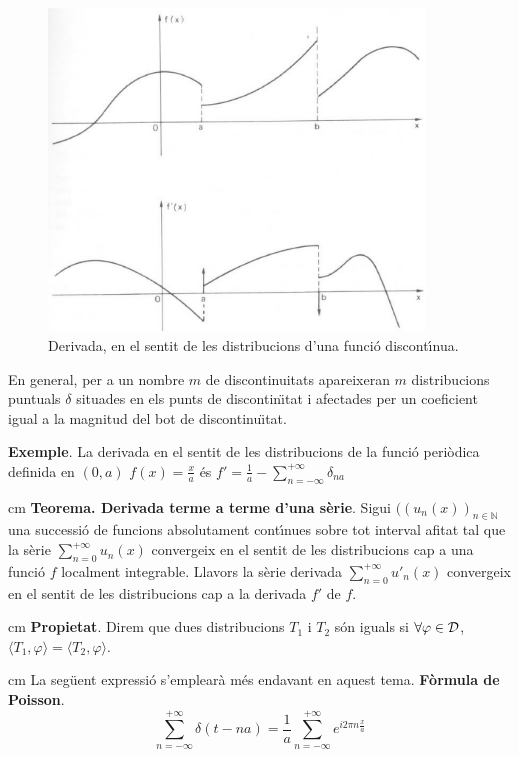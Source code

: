\documentclass{article}
\def\N{\mathbb N}
\begin{document}
\begin{figure}[htbp]
\begin{center}
\includegraphics[width=10cm]{imatges/derdiscontinua.eps}
\caption{Derivada, en el sentit de les distribucions d'una funci\'o
discont\'\i nua.}
\label{derBot.fig}
\end{center}
\end{figure}

\noindent
En general, per a un nombre $m$ de discontinuitats apareixeran $m$ 
distribucions puntuals $\delta$ situades en els punts de discontin\"\i tat
i afectades per un coeficient igual a la magnitud del bot de 
discontinu\"\i tat.

\noindent
\textbf{Exemple}. La derivada en el sentit de les distribucions de la funci\'o 
peri\`odica definida en $(0, a)$ $f(x)=\frac{x}{a}$ \'es 
$f'=\frac{1}{a} - \sum_{n=-\infty}^{+\infty} \delta_{na}$

 cm
\noindent
\textbf{Teorema. Derivada terme a terme d'una s\`erie}. Sigui 
$((u_n(x))_{n \in \N}$ una successi\'o de funcions absolutament cont\'\i nues
sobre tot interval afitat tal que la s\`erie 
$\sum_{n=0}^{+\infty} u_n(x)$ convergeix en el sentit de les distribucions
cap a una funci\'o $f$ localment integrable. Llavors la s\`erie derivada 
$\sum_{n=0}^{+\infty} u'_n(x)$ convergeix en el sentit de les distribucions
cap a la derivada $f'$ de $f$.

 cm
\noindent
\textbf{Propietat}. Direm que dues distribucions $T_1$ i $T_2$ s\'on iguals si
$\forall \varphi \in {\cal D}$, 
$\langle T_1, \varphi \rangle = \langle T_2, \varphi \rangle$.

 cm 
\noindent
La seg\"uent expressi\'o s'emplear\`a m\'es endavant en aquest tema.
\newline
\noindent
\textbf{F\`ormula de Poisson}. 
\begin{equation}
\label{Poisson}
\sum_{n=-\infty}^{+\infty} \delta(t-na)=
\frac{1}{a} \sum_{n=-\infty}^{+\infty} e^{i 2 \pi n \frac{x}{a}}
\end{equation}
\end{document}
